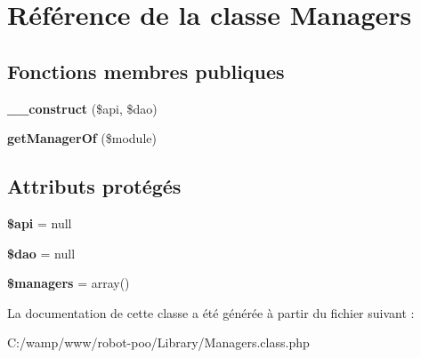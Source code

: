 \hypertarget{class_library_1_1_managers}{\section{Référence de la classe Managers}
\label{class_library_1_1_managers}
}
\subsection*{Fonctions membres publiques}
\begin{DoxyCompactItemize}
\item 
\hypertarget{class_library_1_1_managers_a0f47fc1c0d54c2459c5d5a2538e96227}{{\bfseries \+\_\+\+\_\+construct} (\$api, \$dao)}\label{class_library_1_1_managers_a0f47fc1c0d54c2459c5d5a2538e96227}

\item 
\hypertarget{class_library_1_1_managers_aca1d7dce3d6e4ef3dd2daff9ef5000e3}{{\bfseries get\+Manager\+Of} (\$module)}\label{class_library_1_1_managers_aca1d7dce3d6e4ef3dd2daff9ef5000e3}

\end{DoxyCompactItemize}
\subsection*{Attributs protégés}
\begin{DoxyCompactItemize}
\item 
\hypertarget{class_library_1_1_managers_afce321e6f53c241037f871b50680cf1c}{{\bfseries \$api} = null}\label{class_library_1_1_managers_afce321e6f53c241037f871b50680cf1c}

\item 
\hypertarget{class_library_1_1_managers_ae912a0b57d8a8d02c49652e6a3322dd2}{{\bfseries \$dao} = null}\label{class_library_1_1_managers_ae912a0b57d8a8d02c49652e6a3322dd2}

\item 
\hypertarget{class_library_1_1_managers_a36678d0596f4933e4c00d74488a7f023}{{\bfseries \$managers} = array()}\label{class_library_1_1_managers_a36678d0596f4933e4c00d74488a7f023}

\end{DoxyCompactItemize}


La documentation de cette classe a été générée à partir du fichier suivant \+:\begin{DoxyCompactItemize}
\item 
C\+:/wamp/www/robot-\/poo/\+Library/Managers.\+class.\+php\end{DoxyCompactItemize}
